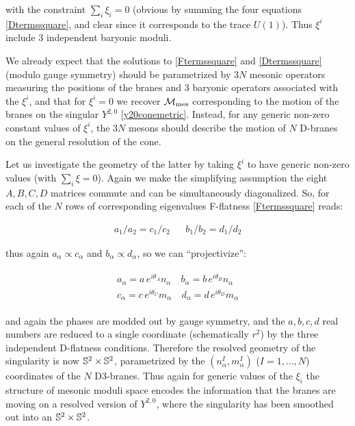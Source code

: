 with the constraint $\sum_i \xi_i = 0$ (obvious by summing the four equations \eqref{Dtermssquare}, and clear since it corresponds to the trace $U(1)$). Thus $\xi^i$ include $3$ independent baryonic moduli.

We already expect that the solutions to \eqref{Ftermssquare} and \eqref{Dtermssquare} (modulo gauge symmetry) should be parametrized by $3N$ mesonic operators measuring the positions of the branes and $3$ baryonic operators associated with the $\xi^i$, and that for $\xi^i = 0$ we recover $\mathcal{M}_\mathrm{mes}$ corresponding to the motion of the branes on the singular $Y^{2,0}$ \eqref{y20conemetric}. Instead, for any generic non-zero constant values of $\xi^i$, the $3N$ mesons should describe the motion of $N$ D-branes on the general resolution of the cone. 

Let us investigate the geometry of the latter by taking $\xi^i$ to have generic non-zero values (with $\sum_i \xi = 0$). Again we make the simplifying assumption the eight $A, B, C, D$ matrices commute and can be simultaneously diagonalized. So, for each of the $N$ rows of corresponding eigenvalues F-flatness \eqref{Ftermssquare} reads:

\begin{align}
	a_1/a_2 = c_1/c_2 && b_1/b_2 = d_1 / d_2
	\label{}
\end{align}

thus again $a_\alpha \propto c_\alpha$ and $b_\alpha \propto d_\alpha$, so we can ``projectivize'':

\begin{align}\begin{split}
		a_\alpha = a \, e^{i\theta_A} n_\alpha \quad b_\alpha = b \, e^{i\theta_B} n_\alpha \\
		c_\alpha = c \, e^{i\theta_C} m_\alpha \quad d_\alpha = d \, e^{i\theta_D} m_\alpha 
	\end{split}\end{align}

and again the phases are modded out by gauge symmetry, and the $a, b, c, d$ real numbers are reduced to a single coordinate (schematically $r^2$) by the three independent D-flatness conditions. Therefore the resolved geometry of the singularity is now $\mathbb{S}^2 \times \mathbb{S}^2$, parametrized by the $(n^I_\alpha,m^I_\alpha)$ ($I=1,\ldots,N$) coordinates of the $N$ D3-branes. Thus again for generic values of the $\xi_i$ the structure of mesonic moduli space encodes the information that the branes are moving on a resolved version of $Y^{2,0}$, where the singularity has been smoothed out into an $\mathbb{S}^2 \times \mathbb{S}^2$.

